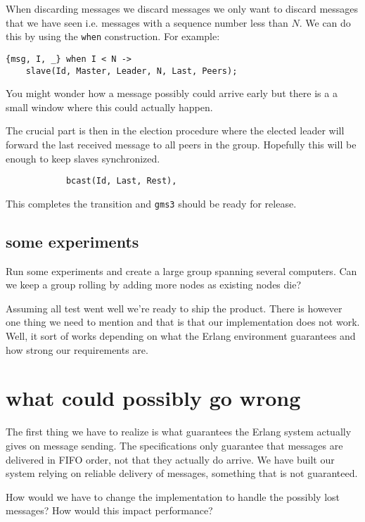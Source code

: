\documentclass[a4paper,11pt]{article}
\begin{document}
When discarding messages we discard messages we only want to discard
messages that we have seen i.e. messages with a sequence number less
than $N$. We can do this by using the {\tt when} construction. For example:

\begin{verbatim}
{msg, I, _} when I < N ->
    slave(Id, Master, Leader, N, Last, Peers);
\end{verbatim}

You might wonder how a message possibly could arrive early but there
is a a small window where this could actually happen.

The crucial part is then in the election procedure where the elected
leader will forward the last received message to all peers in the
group. Hopefully this will be enough to keep slaves synchronized.

\begin{verbatim}
            bcast(Id, Last, Rest),
\end{verbatim}

This completes the transition and {\tt gms3} should be ready for
release. 

\subsection{some experiments}

Run some experiments and create a large group spanning several
computers. Can we keep a group rolling by adding more nodes as
existing nodes die?

Assuming all test went well we're ready to ship the product. There is
however one thing we need to mention and that is that our
implementation does not work. Well, it sort of works depending on what
the Erlang environment guarantees and how strong our requirements are.

\section{what could possibly go wrong}

The first thing we have to realize is what guarantees the Erlang
system actually gives on message sending. The specifications only
guarantee that messages are delivered in FIFO order, not that they
actually do arrive. We have built our system relying on reliable
delivery of messages, something that is not guaranteed.

How would we have to change the implementation to handle the possibly
lost messages? How would this impact performance?
\end{document}

